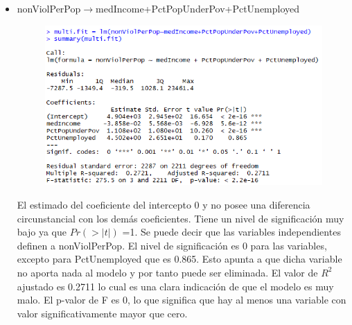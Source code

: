 \documentclass[a4paper,10pt,twocolumn]{article}
\begin{document}
\begin{itemize}
	\item {nonViolPerPop$\rightarrow$medIncome+PctPopUnderPov+PctUnemployed}
			
			
			
			
			
		
		\begin{figure}[H]
			\begin{center}
				\includegraphics[width=.92\columnwidth,right]{figures/multifit5.png}
			\end{center}
		\end{figure}
	El estimado del coeficiente del intercepto 0 y no posee una diferencia circunstancial con los demás coeficientes. Tiene un nivel de significación muy bajo ya que $Pr(> | t | )$ =1.
	Se puede decir que las variables independientes definen a nonViolPerPop. El nivel de significación es 0 para las variables, excepto para PctUnemployed que es 0.865. Esto apunta a que dicha variable no aporta nada al modelo y por tanto puede ser eliminada. El valor de $R^2$ ajustado es 0.2711 lo cual es una clara indicación de que el modelo es muy malo. El p-valor de F es 0, lo que significa que hay al menos una variable con valor significativamente mayor que cero.


\end{itemize}
\end{document}
